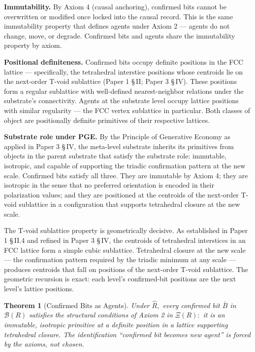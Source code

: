 \documentclass[11pt,oneside]{report}
\newtheorem{theorem}{Theorem}[section]
\theoremstyle{definition}
\theoremstyle{remark}
\begin{document}
\textbf{Immutability.} By Axiom 4 (causal anchoring), confirmed bits
cannot be overwritten or modified once locked into the causal record.
This is the same immutability property that defines agents under Axiom 2
--- agents do not change, move, or degrade. Confirmed bits and agents
share the immutability property by axiom.

\textbf{Positional definiteness.} Confirmed bits occupy definite
positions in the FCC lattice --- specifically, the tetrahedral
interstice positions whose centroids lie on the next-order T-void
sublattice (Paper 1 \S\,II; Paper 3 \S\,IV). These positions form a regular
sublattice with well-defined nearest-neighbor relations under the
substrate's connectivity. Agents at the substrate level occupy lattice
positions with similar regularity --- the FCC vertex sublattice in
particular. Both classes of object are positionally definite primitives
of their respective lattices.

\textbf{Substrate role under PGE.} By the Principle of Generative
Economy as applied in Paper 3 \S\,IV, the meta-level substrate inherits its
primitives from objects in the parent substrate that satisfy the
substrate role: immutable, isotropic, and capable of supporting the
triadic confirmation pattern at the new scale. Confirmed bits satisfy
all three. They are immutable by Axiom 4; they are isotropic in the
sense that no preferred orientation is encoded in their polarization
values; and they are positioned at the centroids of the next-order
T-void sublattice in a configuration that supports tetrahedral closure
at the new scale.

The T-void sublattice property is geometrically decisive. As established
in Paper 1 \S\,II.4 and refined in Paper 3 \S\,IV, the centroids of
tetrahedral interstices in an FCC lattice form a simple cubic
sublattice. Tetrahedral closure at the new scale --- the confirmation
pattern required by the triadic minimum at any scale --- produces
centroids that fall on positions of the next-order T-void sublattice.
The geometric recursion is exact: each level's confirmed-bit positions
are the next level's lattice positions.

\begin{theorem}[Confirmed Bits as Agents]
Under \ensuremath{\hat{R},} every confirmed
bit \ensuremath{\bar{B}} in \ensuremath{\mathcal{B}(R)} satisfies the structural conditions of Axiom 2 in \ensuremath{\Xi (R):} it
is an immutable, isotropic primitive at a definite position in a lattice
supporting tetrahedral closure. The identification ``confirmed bit
becomes new agent'' is forced by the axioms, not chosen.
\end{theorem}
\end{document}
